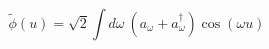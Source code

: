 \begin{equation}
 \tilde{\phi}(u) = \sqrt{2}
 \int d\omega~(a_\omega + a^\dagger_\omega)\cos(\omega u)
\end{equation}

